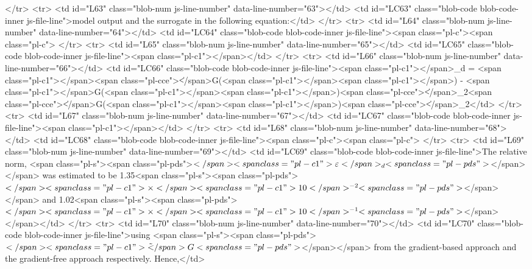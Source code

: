       </tr>
      <tr>
        <td id="L63" class="blob-num js-line-number" data-line-number="63"></td>
        <td id="LC63" class="blob-code blob-code-inner js-file-line">model output and the surrogate in the following equation:</td>
      </tr>
      <tr>
        <td id="L64" class="blob-num js-line-number" data-line-number="64"></td>
        <td id="LC64" class="blob-code blob-code-inner js-file-line"><span class="pl-c"><span class="pl-c">%
      </tr>
      <tr>
        <td id="L65" class="blob-num js-line-number" data-line-number="65"></td>
        <td id="LC65" class="blob-code blob-code-inner js-file-line"><span class="pl-c1">\be</span></td>
      </tr>
      <tr>
        <td id="L66" class="blob-num js-line-number" data-line-number="66"></td>
        <td id="LC66" class="blob-code blob-code-inner js-file-line"><span class="pl-c1">\varepsilon</span>_d = <span class="pl-c1">\frac</span>{<span class="pl-cce">\|</span>G(<span class="pl-c1">\bm</span>{<span class="pl-c1">\xi</span>}) - <span class="pl-c1">\tilde</span>{G}(<span class="pl-c1">\bm</span>{<span class="pl-c1">\xi</span>})<span class="pl-cce">\|</span>_2}{<span class="pl-cce">\|</span>G(<span class="pl-c1">\bm</span>{<span class="pl-c1">\xi</span>})<span class="pl-cce">\|</span>_2}</td>
      </tr>
      <tr>
        <td id="L67" class="blob-num js-line-number" data-line-number="67"></td>
        <td id="LC67" class="blob-code blob-code-inner js-file-line"><span class="pl-c1">\ee</span></td>
      </tr>
      <tr>
        <td id="L68" class="blob-num js-line-number" data-line-number="68"></td>
        <td id="LC68" class="blob-code blob-code-inner js-file-line"><span class="pl-c"><span class="pl-c">%
      </tr>
      <tr>
        <td id="L69" class="blob-num js-line-number" data-line-number="69"></td>
        <td id="LC69" class="blob-code blob-code-inner js-file-line">The relative norm, <span class="pl-s"><span class="pl-pds">$</span><span class="pl-c1">\varepsilon</span>_d<span class="pl-pds">$</span></span> was estimated to be 1.35<span class="pl-s"><span class="pl-pds">$</span><span class="pl-c1">\times</span><span class="pl-c1">10</span>^{-2}<span class="pl-pds">$</span></span> and 1.02<span class="pl-s"><span class="pl-pds">$</span><span class="pl-c1">\times</span><span class="pl-c1">10</span>^{-1}<span class="pl-pds">$</span></span></td>
      </tr>
      <tr>
        <td id="L70" class="blob-num js-line-number" data-line-number="70"></td>
        <td id="LC70" class="blob-code blob-code-inner js-file-line">using <span class="pl-s"><span class="pl-pds">$</span><span class="pl-c1">\tilde</span>{G}<span class="pl-pds">$</span></span> from the gradient-based approach and the gradient-free approach respectively. Hence,</td>
